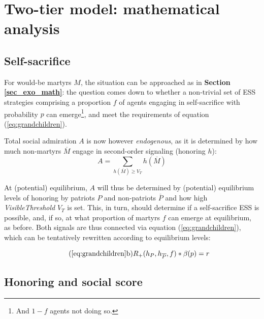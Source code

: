 \documentclass[a4paper,12pt]{report}
\begin{document}
\section{Two-tier model: mathematical analysis}


\subsection{Self-sacrifice}
For would-be martyrs $M$, the situation can be approached as in \textbf{Section \ref{sec_exo_math}}: the question comes down
to whether a non-trivial set of ESS strategies comprising a proportion $f$ of agents engaging in
self-sacrifice with probability $p$ can emerge\footnote{And $1-f$ agents not doing so.},
and meet the requirements of equation (\ref{eq:grandchildren}).

Total social admiration $A$ is now however \emph{endogenous}, as it is determined by how much
non-martyrs $\overline{M}$ engage in second-order signaling (honoring $h$):
\begin{equation}
    \label{eq:A_h}
        A = \sum_{h(\overline{M}) \geq V_T}{h(\overline{M})}
\end{equation}

At (potential) equilibrium, $A$ will thus be determined by (potential) equilibrium levels
of honoring by patriots $P$ and non-patriots $\overline{P}$ and how high 
\emph{VisibleThreshold} $V_T$ is set. This, in turn, should determine
 if a self-sacrifice ESS is possible,
and, if so, at what proportion of martyrs $f$ can emerge at equilibrium, as before. Both
signals are thus connected via equation (\ref{eq:grandchildren}), which
can be tentatively rewritten according to equilibrium levels:

\begin{equation}
    \tag{\ref{eq:grandchildren}b}
    R_+(h_{P},h_{\overline{P}},f)*\beta(p) = r
\end{equation}

\subsection{Honoring and social score}
\end{document}
